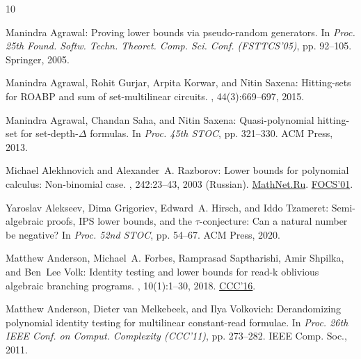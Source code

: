 \documentclass[11pt]{article}
\numberwithin{equation}{section}
\theoremstyle{definition}
\theoremstyle{plain}
\begin{document}
\tocrefpdfbookmark
\begin{thebibliography}{10}

{\sc Manindra Agrawal}: Proving lower bounds via pseudo-random generators.
\newblock In {\em Proc. 25th Found. Softw. Techn. Theoret. Comp. Sci. Conf.
  (FSTTCS'05)}, pp. 92--105. Springer, 2005.
\newblock [\epfmtdoi{10.1007/11590156\_6}]

{\sc Manindra Agrawal, Rohit Gurjar, Arpita Korwar, and Nitin Saxena}:
  Hitting-sets for {ROABP} and sum of set-multilinear circuits.
, 44(3):669--697, 2015.

{\sc Manindra Agrawal, Chandan Saha, and Nitin Saxena}: Quasi-polynomial
  hitting-set for set-depth-{$\Delta$} formulas.
\newblock In {\em Proc. 45th STOC}, pp. 321--330. ACM Press, 2013.

{\sc Michael Alekhnovich and Alexander~A. Razborov}: Lower bounds for
  polynomial calculus: Non-binomial case.
, 242:23--43, 2003 (Russian).
\newblock
  \href{http://www.mathnet.ru/links/5e7b37974f29cb6fc75ba1ecf6ad19b5/tm403.pdf}{MathNet.Ru}.
  \prelim \href{https://doi.org/10.1109/SFCS.2001.959893}{FOCS'01}.

{\sc Yaroslav Alekseev, Dima Grigoriev, Edward~A. Hirsch, and Iddo Tzameret}:
  Semi-algebraic proofs, {IPS} lower bounds, and the {\(\tau\)}-conjecture:
  {C}an a natural number be negative?
\newblock In {\em Proc. 52nd STOC}, pp. 54--67. ACM Press, 2020.

{\sc Matthew Anderson, Michael~A. Forbes, Ramprasad Saptharishi, Amir Shpilka,
  and Ben~Lee Volk}: Identity testing and lower bounds for read-k oblivious
  algebraic branching programs.
, 10(1):1--30, 2018.
\newblock \prelim \href{https://doi.org/10.4230/LIPIcs.CCC.2016.30}{CCC'16}.

{\sc Matthew Anderson, Dieter van Melkebeek, and Ilya Volkovich}: Derandomizing
  polynomial identity testing for multilinear constant-read formulae.
\newblock In {\em Proc. 26th IEEE Conf. on Comput. Complexity (CCC'11)}, pp.
  273--282. IEEE Comp. Soc., 2011.


\end{thebibliography}
\end{document}
